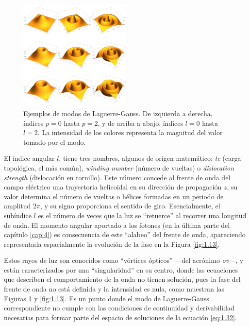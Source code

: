 \begin{figure}[htbp]
  \centering
  \includegraphics[width=0.5\textwidth]{Figuras/ch1_lague_gauss.png}
  \caption{Ejemplos de modos de Laguerre-Gauss. De izquierda a derecha, índices $p=0$ hasta $p=2$, y de arriba a abajo, índices $l=0$ hasta $l=2$. La intensidad de los colores representa la magnitud del valor tomado por el modo.}
  \label{fig:1.12}
\end{figure}

El índice angular $l$, tiene tres nombres, algunos de origen matemático: \autocite{Yao2011} \emph{\acrfull{tc}} (carga topológica, el más común), \emph{winding number} (número de vueltas) o \emph{dislocation strength} (dislocación en tornillo). Este número concede al frente de onda del campo eléctrico una trayectoria helicoidal en su dirección de propagación $z$, su valor determina el número de vueltas o hélices formadas en un periodo de amplitud $2 \pi$, y su signo proporciona el sentido de giro. Esencialmente, el subíndice $l$ es el número de veces que la luz se \enquote{retuerce} al recorrer una longitud de onda. El momento angular aportado a los fotones (en la última parte del capítulo \ref{cap:4}) es consecuencia de este \enquote{alabeo} del frente de onda, apareciendo representada espacialmente la evolución de la fase en la Figura \ref{fig:1.13}.

Estos rayos de luz son conocidos como \enquote{vórtices ópticos} ---del acrónimo \emph{\acrfull{ov}}---, y están caracterizados por una \enquote{singularidad} en su centro, donde las ecuaciones que describen el comportamiento de la onda no tienen solución, pues la fase del frente de onda no está definida y la intensidad es nula, como muestran las Figuras \ref{fig:1.12} y \ref{fig:1.13}. Es un punto donde el modo de Laguerre-Gauss correspondiente no cumple con las condiciones de continuidad y derivabilidad necesarias para formar parte del espacio de soluciones de la ecuación \eqref{eq:1.32}.

